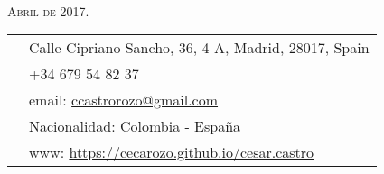 \documentclass[11pt]{article}\usepackage[]{graphicx}\usepackage[]{color}
\begin{document}
\par{\\
\vspace{5pt}
{\color{headings} \scshape{Abril de 2017.}}\\
\vspace{10pt}}

\colorbox{shade}{{
\begin{tabular}{c|p{13cm}}
\vspace{5pt}\raisebox{-4pt}{\textifsymbol{18}} & Calle Cipriano Sancho, 36, 4-A, Madrid, 28017, Spain\\
\vspace{5pt}\raisebox{-4pt}{\Mobilefone} & +34 679 54 82 37\\
\vspace{5pt}\raisebox{-4pt}{\Letter} & email: \href{mailto:castrorozo@gmail.com}{ccastrorozo@gmail.com} \\
\vspace{5pt}\raisebox{-4pt}{\Aquarius} & Nacionalidad: Colombia - España\\
\vspace{5pt}\raisebox{-4pt}{\Mundus} & www: \href{https://cecarozo.github.io/cesar.castro}{https://cecarozo.github.io/cesar.castro}\\
\end{tabular}
}
}\\[10pt]



\end{document}

